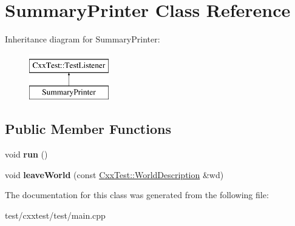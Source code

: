 \hypertarget{classSummaryPrinter}{\section{Summary\-Printer Class Reference}
\label{classSummaryPrinter}
}
Inheritance diagram for Summary\-Printer\-:\begin{figure}[H]
\begin{center}
\leavevmode
\includegraphics[height=2.000000cm]{classSummaryPrinter}
\end{center}
\end{figure}
\subsection*{Public Member Functions}
\begin{DoxyCompactItemize}
\item 
\hypertarget{classSummaryPrinter_a0cbdd475f7a15b727d4ec851f5ddf634}{void {\bfseries run} ()}\label{classSummaryPrinter_a0cbdd475f7a15b727d4ec851f5ddf634}

\item 
\hypertarget{classSummaryPrinter_a9d09e20e15857dd7f86603cd8c772810}{void {\bfseries leave\-World} (const \hyperlink{classCxxTest_1_1WorldDescription}{Cxx\-Test\-::\-World\-Description} \&wd)}\label{classSummaryPrinter_a9d09e20e15857dd7f86603cd8c772810}

\end{DoxyCompactItemize}


The documentation for this class was generated from the following file\-:\begin{DoxyCompactItemize}
\item 
test/cxxtest/test/main.\-cpp\end{DoxyCompactItemize}
